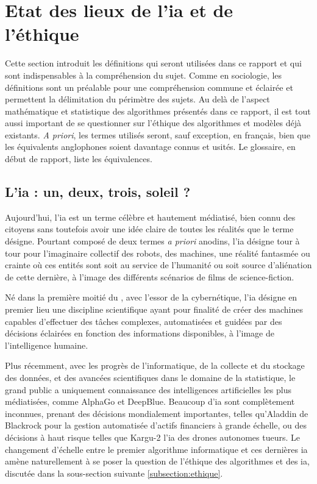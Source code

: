 \section{Etat des lieux de l'\gls{ia} et de l'éthique}

Cette section introduit les définitions qui seront utilisées dans ce rapport et qui sont indispensables à la compréhension du sujet. Comme en sociologie, les définitions sont un préalable pour une compréhension commune et éclairée et permettent la délimitation du périmètre des sujets. Au delà de l'aspect mathématique et statistique des algorithmes présentés dans ce rapport, il est tout aussi important de se questionner sur l'éthique des algorithmes et modèles déjà existants. \textit{A priori}, les termes utilisés seront, sauf exception, en français, bien que les équivalents anglophones soient davantage connus et usités. Le glossaire, en début de rapport, liste les équivalences.

\subsection{L'\gls{ia} : un, deux, trois, soleil ?}

Aujourd'hui, l'\gls{ia} est un terme célèbre et hautement médiatisé, bien connu des citoyens sans toutefois avoir une idée claire de toutes les réalités que le terme désigne. Pourtant composé de deux termes \textit{a priori} anodins, l'\gls{ia} désigne tour à tour pour l'imaginaire collectif des robots, des machines, une réalité fantasmée ou crainte où ces entités sont soit au service de l'humanité ou soit source d'aliénation de cette dernière, à l'image des différents scénarios de films de science-fiction.


Né dans la première moitié du , avec l'essor de la cybernétique, l'\gls{ia} désigne en premier lieu une discipline scientifique ayant pour finalité de créer des machines capables d'effectuer des tâches complexes, automatisées et guidées par des décisions éclairées en fonction des informations disponibles, à l'image de l'intelligence humaine.

Plus récemment, avec les progrès de l'informatique, de la collecte et du stockage des données, et des avancées scientifiques dans le domaine de la statistique, le grand public a uniquement connaissance des intelligences artificielles les plus médiatisées, comme AlphaGo et DeepBlue. Beaucoup d'\gls{ia} sont complètement inconnues, prenant des décisions mondialement importantes, telles qu'Aladdin de Blackrock pour la gestion automatisée d'actifs financiers à grande échelle, ou des décisions à haut risque telles que Kargu-2 l'\gls{ia} des drones autonomes tueurs. Le changement d'échelle entre le premier algorithme informatique et ces dernières \gls{ia} amène naturellement à se poser la question de l'éthique des algorithmes et des \gls{ia}, discutée dans la sous-section suivante \ref{subsection:ethique}.

